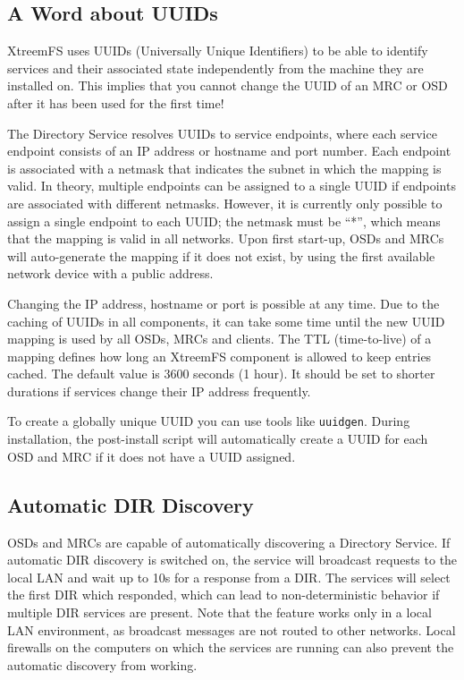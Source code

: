 \documentclass[a4paper,10pt]{book}
\begin{document}
\subsection{A Word about UUIDs}

XtreemFS uses UUIDs (Universally Unique Identifiers) to be able to identify services and their associated state independently from the machine they are installed on. This implies that you cannot change the UUID of an MRC or OSD after it has been used for the first time!

The Directory Service resolves UUIDs to service endpoints, where each service endpoint consists of an IP address or hostname and port number. Each endpoint is associated with a netmask that indicates the subnet in which the mapping is valid. In theory, multiple endpoints can be assigned to a single UUID if endpoints are associated with different netmasks. However, it is currently only possible to assign a single endpoint to each UUID; the netmask must be ``*'', which means that the mapping is valid in all networks. Upon first start-up, OSDs and MRCs will auto-generate the mapping if it does not exist, by using the first available network device with a public address.

Changing the IP address, hostname or port is possible at any time. Due to the caching of UUIDs in all components, it can take some time until the new UUID mapping is used by all OSDs, MRCs and clients. The TTL (time-to-live) of a mapping defines how long an XtreemFS component is allowed to keep entries cached. The default value is 3600 seconds (1 hour). It should be set to shorter durations if services change their IP address frequently.

To create a globally unique UUID you can use tools like \texttt{uuidgen}. During installation, the post-install script will automatically create a UUID for each OSD and MRC if it does not have a UUID assigned.

\subsection{Automatic DIR Discovery}
\label{sec:autodiscover}
OSDs and MRCs are capable of automatically discovering a Directory Service. If automatic DIR discovery is switched on, the service will broadcast requests to the local LAN and wait up to 10s for a response from a DIR. The services will select the first DIR which responded, which can lead to non-deterministic behavior if multiple DIR services are present. Note that the feature works only in a local LAN environment, as broadcast messages are not routed to other networks. Local firewalls on the computers on which the services are running can also prevent the automatic discovery from working.
\end{document}
